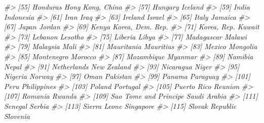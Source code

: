 \documentclass[
  xelatex, ja=standard]{bxjsbook}
\newenvironment{Shaded}{\begin{snugshade}}{\end{snugshade}}
\newcommand{\CommentTok}[1]{\textcolor[rgb]{0.56,0.35,0.01}{\textit{#1}}}
\theoremstyle{definition}
\theoremstyle{definition}
\theoremstyle{definition}
\theoremstyle{definition}
\theoremstyle{remark}
\begin{document}
\begin{Shaded}
\begin{Highlighting}[]
\CommentTok{\#\textgreater{}  [55] Honduras                 Hong Kong, China        }
\CommentTok{\#\textgreater{}  [57] Hungary                  Iceland                 }
\CommentTok{\#\textgreater{}  [59] India                    Indonesia               }
\CommentTok{\#\textgreater{}  [61] Iran                     Iraq                    }
\CommentTok{\#\textgreater{}  [63] Ireland                  Israel                  }
\CommentTok{\#\textgreater{}  [65] Italy                    Jamaica                 }
\CommentTok{\#\textgreater{}  [67] Japan                    Jordan                  }
\CommentTok{\#\textgreater{}  [69] Kenya                    Korea, Dem. Rep.        }
\CommentTok{\#\textgreater{}  [71] Korea, Rep.              Kuwait                  }
\CommentTok{\#\textgreater{}  [73] Lebanon                  Lesotho                 }
\CommentTok{\#\textgreater{}  [75] Liberia                  Libya                   }
\CommentTok{\#\textgreater{}  [77] Madagascar               Malawi                  }
\CommentTok{\#\textgreater{}  [79] Malaysia                 Mali                    }
\CommentTok{\#\textgreater{}  [81] Mauritania               Mauritius               }
\CommentTok{\#\textgreater{}  [83] Mexico                   Mongolia                }
\CommentTok{\#\textgreater{}  [85] Montenegro               Morocco                 }
\CommentTok{\#\textgreater{}  [87] Mozambique               Myanmar                 }
\CommentTok{\#\textgreater{}  [89] Namibia                  Nepal                   }
\CommentTok{\#\textgreater{}  [91] Netherlands              New Zealand             }
\CommentTok{\#\textgreater{}  [93] Nicaragua                Niger                   }
\CommentTok{\#\textgreater{}  [95] Nigeria                  Norway                  }
\CommentTok{\#\textgreater{}  [97] Oman                     Pakistan                }
\CommentTok{\#\textgreater{}  [99] Panama                   Paraguay                }
\CommentTok{\#\textgreater{} [101] Peru                     Philippines             }
\CommentTok{\#\textgreater{} [103] Poland                   Portugal                }
\CommentTok{\#\textgreater{} [105] Puerto Rico              Reunion                 }
\CommentTok{\#\textgreater{} [107] Romania                  Rwanda                  }
\CommentTok{\#\textgreater{} [109] Sao Tome and Principe    Saudi Arabia            }
\CommentTok{\#\textgreater{} [111] Senegal                  Serbia                  }
\CommentTok{\#\textgreater{} [113] Sierra Leone             Singapore               }
\CommentTok{\#\textgreater{} [115] Slovak Republic          Slovenia                }

\end{Highlighting}
\end{Shaded}
\end{document}
